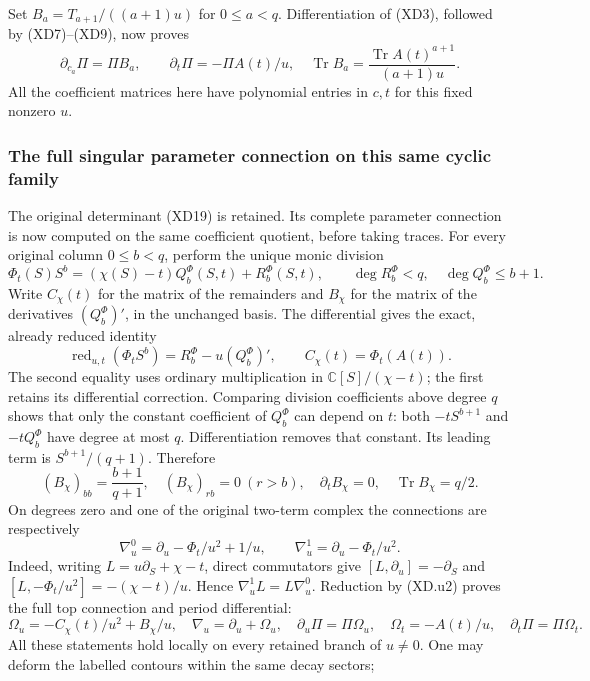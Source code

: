 Set $B_a=T_{a+1}/((a+1)u)$ for $0\leq a<q$. Differentiation
of (XD3), followed by (XD7)--(XD9), now proves
\[
 \partial_{c_a}\Pi=\Pi B_a,\qquad
 \partial_t\Pi=-\Pi A(t)/u,
 \quad\operatorname{Tr}B_a
  =\frac{\operatorname{Tr}A(t)^{a+1}}{(a+1)u}.
 \tag{XD12}
\]
All the coefficient matrices here have polynomial entries in $c,t$
for this fixed nonzero $u$.


\subsubsection{The full singular parameter connection on this same cyclic family}

The original determinant (XD19) is retained.  Its complete parameter
connection is now computed on the same coefficient quotient, before
taking traces.  For every original column $0\le b<q$, perform the
unique monic division
\[
 \Phi_t(S)S^b=(\chi(S)-t)Q_b^\Phi(S,t)+R_b^\Phi(S,t),
 \qquad \deg R_b^\Phi<q,\quad\deg Q_b^\Phi\le b+1.
 \tag{XD.u1}
\]
Write $C_\chi(t)$ for the matrix of the remainders and $B_\chi$ for
the matrix of the derivatives $(Q_b^\Phi)'$, in the unchanged basis.
The differential gives the exact, already reduced identity
\[
 \operatorname{red}_{u,t}(\Phi_t S^b)=R_b^\Phi-u(Q_b^\Phi)',\qquad
 C_\chi(t)=\Phi_t(A(t)).                              \tag{XD.u2}
\]
The second equality uses ordinary multiplication in $\mathbb C[S]/(\chi-t)$;
the first retains its differential correction.  Comparing division
coefficients above degree $q$ shows that only the constant coefficient
of $Q_b^\Phi$ can depend on $t$: both $-tS^{b+1}$ and $-tQ_b^\Phi$
have degree at most $q$.  Differentiation removes that constant.
Its leading term is $S^{b+1}/(q+1)$.  Therefore
\[
 (B_\chi)_{bb}=\frac{b+1}{q+1},\quad
 (B_\chi)_{rb}=0\ (r>b),\quad
 \partial_t B_\chi=0,\quad \operatorname{Tr}B_\chi=q/2.
 \tag{XD.u3}
\]
On degrees zero and one of the original two-term complex the connections
are respectively
\[
 \nabla_u^0=\partial_u-\Phi_t/u^2+1/u,\qquad
 \nabla_u^1=\partial_u-\Phi_t/u^2.                    \tag{XD.u4}
\]
Indeed, writing $L=u\partial_S+\chi-t$, direct commutators give
$[L,\partial_u]=-\partial_S$ and
$[L,-\Phi_t/u^2]=-(\chi-t)/u$.  Hence
$\nabla_u^1L=L\nabla_u^0$.  Reduction by (XD.u2) proves the full
top connection and period differential:
\[
 \Omega_u=-C_\chi(t)/u^2+B_\chi/u,
 \quad\nabla_u=\partial_u+\Omega_u,
 \quad \partial_u\Pi=\Pi\Omega_u,
 \quad\Omega_t=-A(t)/u,\quad\partial_t\Pi=\Pi\Omega_t.
 \tag{XD.u5}
\]
All these statements hold locally on every retained branch of $u\ne0$.
One may deform the labelled contours within the same decay sectors;
